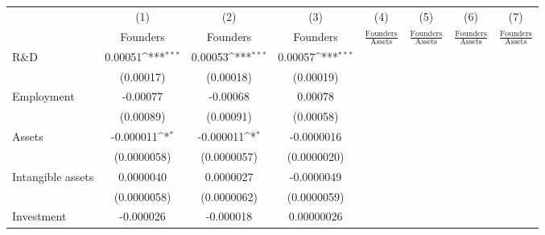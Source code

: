 {
\def\sym#1{\ifmmode^{#1}\else\(^{#1}\)\fi}
\begin{tabular}{l*{7}{c}}
\toprule
                    &\multicolumn{1}{c}{(1)}&\multicolumn{1}{c}{(2)}&\multicolumn{1}{c}{(3)}&\multicolumn{1}{c}{(4)}&\multicolumn{1}{c}{(5)}&\multicolumn{1}{c}{(6)}&\multicolumn{1}{c}{(7)}\\
                    &\multicolumn{1}{c}{Founders}&\multicolumn{1}{c}{Founders}&\multicolumn{1}{c}{Founders}&\multicolumn{1}{c}{$\frac{\textrm{Founders}}{\textrm{Assets}}$}&\multicolumn{1}{c}{$\frac{\textrm{Founders}}{\textrm{Assets}}$}&\multicolumn{1}{c}{$\frac{\textrm{Founders}}{\textrm{Assets}}$}&\multicolumn{1}{c}{$\frac{\textrm{Founders}}{\textrm{Assets}}$}\\
\midrule
R\&D                &     0.00051\sym{***}&     0.00053\sym{***}&     0.00057\sym{***}&                     &                     &                     &                     \\
                    &   (0.00017)         &   (0.00018)         &   (0.00019)         &                     &                     &                     &                     \\
\addlinespace
Employment          &    -0.00077         &    -0.00068         &     0.00078         &                     &                     &                     &                     \\
                    &   (0.00089)         &   (0.00091)         &   (0.00058)         &                     &                     &                     &                     \\
\addlinespace
Assets              &   -0.000011\sym{*}  &   -0.000011\sym{*}  &  -0.0000016         &                     &                     &                     &                     \\
                    & (0.0000058)         & (0.0000057)         & (0.0000020)         &                     &                     &                     &                     \\
\addlinespace
Intangible assets   &   0.0000040         &   0.0000027         &  -0.0000049         &                     &                     &                     &                     \\
                    & (0.0000058)         & (0.0000062)         & (0.0000059)         &                     &                     &                     &                     \\
\addlinespace
Investment          &   -0.000026         &   -0.000018         &  0.00000026         &                     &                     &                     &                     \\

\end{tabular}}
